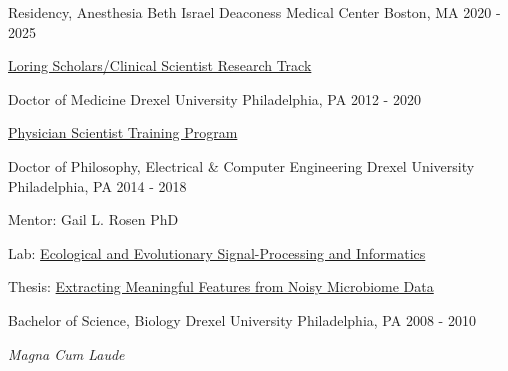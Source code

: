 

\begin{cventries}

  \cventry
    {Residency, Anesthesia}
    {Beth Israel Deaconess Medical Center}
    {Boston, MA}
    {2020 - 2025}
    {
    \begin{cvitems}
    \item \href{https://www.bidmc.org/medical-education/medical-education-by-department/anesthesia-critical-care-and-pain-medicine/anesthesia-residency-program/research-and-other-opportunities/clinician-scientist-track}{Loring Scholars/Clinical Scientist Research Track}
    \end{cvitems}
    }
 
   \cventry
    {Doctor of Medicine} %
    {Drexel University} %
    {Philadelphia, PA} %
    {2012 - 2020} %
    {
    \begin{cvitems} %
    \item \href{https://drexel.edu/medicine/academics/dual-degree-programs/md-phd/students-alumni/}{Physician Scientist Training Program}
    \end{cvitems}
    }
    
  \cventry
    {Doctor of Philosophy, Electrical \& Computer Engineering} %
    {Drexel University} %
    {Philadelphia, PA} %
    {2014 - 2018} %
    {
      \begin{cvitems} %
         \item Mentor: Gail L. Rosen PhD
         \item Lab: \href{http://drexeleesi.com/}{Ecological and Evolutionary Signal-Processing and Informatics}
	 \item Thesis: \href{https://idea.library.drexel.edu/islandora/object/idea\%3A8189}{Extracting Meaningful Features from Noisy Microbiome Data}
      \end{cvitems}
    }
    
  \cventry
    {Bachelor of Science, Biology} %
    {Drexel University} %
    {Philadelphia, PA} %
    {2008 - 2010} %
    {
      \begin{cvitems} %
         \item \textit{Magna Cum Laude}
      \end{cvitems}
    }
    

\end{cventries}
